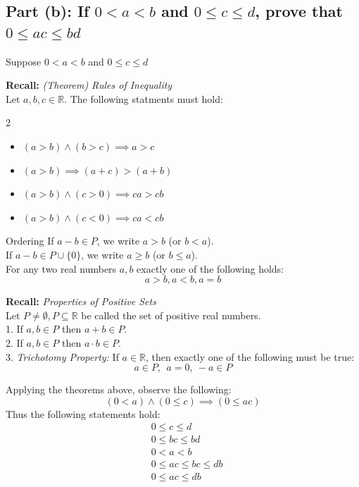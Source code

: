 \documentclass[11pt]{article}
\theoremstyle{plain}
\begin{document}
\subsection*{\textbf{Part (b):} If $0<a<b$ and $0 \leq c \leq d$, prove that $0 \leq ac \leq bd$}
Suppose $0<a<b$ and $0 \leq c \leq d$
\begin{blockquote}
	\textbf{Recall: } \textit{(Theorem) Rules of Inequality} \\
	$\text{Let } a,b,c \in \mathbb{R}$. The following statments must hold:
	\begin{multicols}{2}
		\begin{itemize}
			\item $(a>b) \land (b>c) \implies a>c$
			\item $(a>b) \implies (a+c) > (a+b)$
			\item $(a>b) \land (c>0) \implies ca > cb$
			\item $(a>b) \land (c<0) \implies ca < cb$
		\end{itemize}
	\end{multicols}
	Ordering
	If $a-b \in P$, we write $a>b$ (or $b<a$). \\
	If $a-b \in P \cup \{ 0 \}$, we write $a \geq b$ (or $b \leq a$). \\
	For any two real numbers $a,b$ exactly one of the following holds:
	$$a>b, a<b, a=b$$
\end{blockquote} \noindent
\begin{blockquote}
	\textbf{Recall: } \textit{ Properties of Positive Sets} \\
	Let $P \neq \emptyset, P \subseteq \mathbb{R}$ be called the set of positive real numbers. \\
	1.  If $a,b \in P$ then $a+b \in P$.\\
	2.  If $a,b \in P$ then $a \cdot b \in P$.\\
	3.  \textit{Trichotomy Property:} If $a \in \mathbb{R}$, then exactly one of the following must be true:
	$$a \in P, ~~a = 0, ~-a \in P$$
\end{blockquote} \noindent
Applying the theorems above, observe the following:
\[
	(0 < a) \land (0 \leq c) \implies (0 \leq ac)
\]
Thus the following statements hold:
\[
	\begin{aligned}
		 & 0 \leq c \leq d            \\
		 & 0 \leq bc \leq bd          \\
		 & 0 < a < b                  \\
		 & 0 \leq ac \leq  bc \leq db \\
		 & 0 \leq ac \leq db          \\
	\end{aligned}
\]
\end{document}
